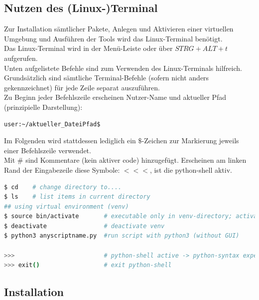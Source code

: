 \documentclass[
a4paper,     %
12pt         %
]{scrartcl}  %
\begin{document}
\subsection{Nutzen des (Linux-)Terminal}
Zur Installation sämtlicher Pakete, Anlegen und Aktivieren einer virtuellen Umgebung und Ausführen der Tools wird das Linux-Terminal benötigt.\\
Das Linux-Terminal wird in der Menü-Leiste oder über $STRG + ALT +t$ aufgerufen.\\
Unten aufgelistete Befehle sind zum Verwenden des Linux-Terminals hilfreich.\\
Grundsätzlich sind sämtliche Terminal-Befehle (sofern nicht anders gekennzeichnet) für jede Zeile separat auszuführen.\\ Zu Beginn jeder Befehlszeile erscheinen Nutzer-Name und aktueller Pfad (prinzipielle Darstellung):
\begin{lstlisting}
user:~/aktueller_DateiPfad$
\end{lstlisting}
Im Folgenden wird stattdessen lediglich ein $\$$-Zeichen zur Markierung jeweils einer Befehlszeile verwendet.\\
Mit $\#$ sind Kommentare (kein aktiver code) hinzugefügt. Erscheinen am linken Rand der Eingabezeile diese Symbole: $<<<$, ist die python-shell aktiv.
\begin{lstlisting}[language=bash]
$ cd 	# change directory to....
$ ls 	# list items in current directory
## using virtual environment (venv)
$ source bin/activate 		# executable only in venv-directory; activate venv
$ deactivate 				# deactivate venv
$ python3 anyscriptname.py 	#run script with python3 (without GUI)

>>> 						# python-shell active -> python-syntax expected
>>> exit() 					# exit python-shell
\end{lstlisting}

\subsection{Installation}
\end{document}
